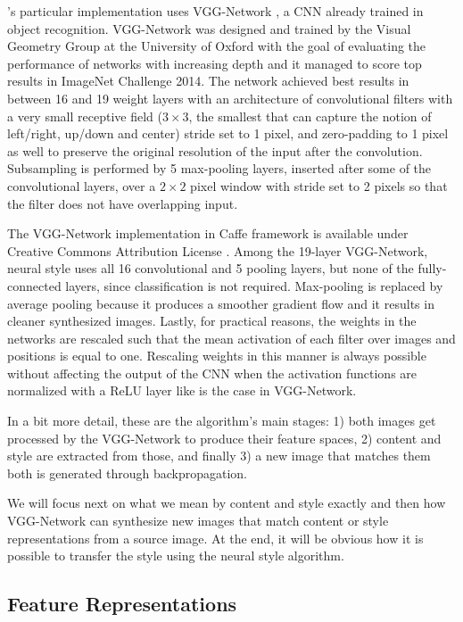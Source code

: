 \citeauthor{Gatys2015B}'s particular implementation uses VGG-Network \cite{Simonyan2014}, a CNN already trained in object recognition.
VGG-Network was designed and trained by the Visual Geometry Group at the University of Oxford with the goal of evaluating the performance of networks with increasing depth and it managed to score top results in ImageNet Challenge 2014.
The network achieved best results in between 16 and 19 weight layers with an architecture of convolutional filters with a very small receptive field (${3}\times{3}$, the smallest that can capture the notion of left/right, up/down and center) stride set to 1 pixel, and zero-padding to 1 pixel as well to preserve the original resolution of the input after the convolution.
Subsampling is performed by 5 max-pooling layers, inserted after some of the convolutional layers, over a ${2}\times{2}$ pixel window with stride set to 2 pixels so that the filter does not have overlapping input.

The VGG-Network implementation in Caffe framework is available under Creative Commons Attribution License \cite{Simonyan2014web}.
Among the 19-layer VGG-Network, neural style uses all 16 convolutional and 5 pooling layers, but none of the fully-connected layers, since classification is not required.
Max-pooling is replaced by average pooling because it produces a smoother gradient flow \cite{Boureau2010} and it results in cleaner synthesized images.
Lastly, for practical reasons, the weights in the networks are rescaled such that the mean activation of each filter over images and positions is equal to one.
Rescaling weights in this manner is always possible without affecting the output of the CNN when the activation functions are normalized with a ReLU layer like is the case in VGG-Network.

In a bit more detail, these are the algorithm's main stages: 1) both images get processed by the VGG-Network to produce their feature spaces, 2) content and style are extracted from those, and finally 3) a new image that matches them both is generated through backpropagation.

We will focus next on what we mean by content and style exactly and then how VGG-Network can synthesize new images that match content or style representations from a source image.
At the end, it will be obvious how it is possible to transfer the style using the neural style algorithm.


\subsection{Feature Representations}
\label{sub:system:method:representations}

